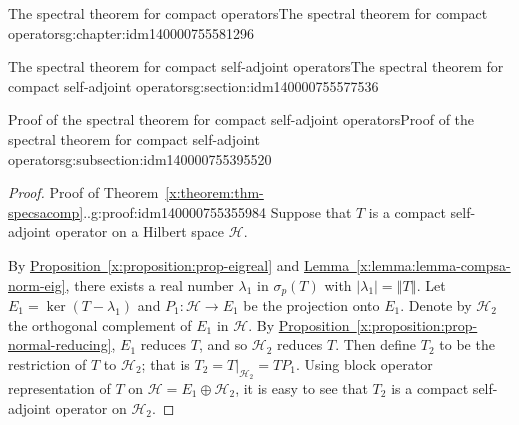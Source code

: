 \documentclass[oneside,10pt,]{book}
\newcommand{\xreffont}{\relax}
\numberwithin{equation}{section}
\newcommand{\hilbert}{\mathcal{H}}
\newcommand{\abs}[1]{\left\vert#1\right\vert}
\newcommand{\norm}[1]{\left\Vert#1\right\Vert}
\newcommand\la{\lambda}
\numberwithin{equation}{section}
\begin{document}
\begin{chapterptx}{The spectral theorem for compact operators}{}{The spectral theorem for compact operators}{}{}{g:chapter:idm140000755581296}
\begin{sectionptx}{The spectral theorem for compact self-adjoint operators}{}{The spectral theorem for compact self-adjoint operators}{}{}{g:section:idm140000755577536}
\begin{subsectionptx}{Proof of the spectral theorem for compact self-adjoint operators}{}{Proof of the spectral theorem for compact self-adjoint operators}{}{}{g:subsection:idm140000755395520}
\begin{proof}{Proof of Theorem~{\xreffont\ref*{x:theorem:thm-specsacomp}}..}{g:proof:idm140000755355984}
Suppose that \(T\) is a compact self-adjoint operator on a Hilbert space \(\hilbert\).%
\par
By \hyperref[x:proposition:prop-eigreal]{Proposition~{\xreffont\ref{x:proposition:prop-eigreal}}} and \hyperref[x:lemma:lemma-compsa-norm-eig]{Lemma~{\xreffont\ref{x:lemma:lemma-compsa-norm-eig}}}, there exists a real number \(\la_1\) in \(\sigma_p(T)\) with \(\abs{\la_1} = \norm{T}\). Let \(E_1 = \ker(T - \la_1)\) and \(P_1:\hilbert \to E_1\) be the projection onto \(E_1\). Denote by \(\hilbert_2\) the orthogonal complement of \(E_1\) in \(\hilbert\). By \hyperref[x:proposition:prop-normal-reducing]{Proposition~{\xreffont\ref{x:proposition:prop-normal-reducing}}}, \(E_1\) reduces \(T\), and so \(\hilbert_2\) reduces \(T\). Then define \(T_2\) to be the restriction of \(T\) to \(\hilbert_2\); that is \(T_2 = T\vert_{\hilbert_2} = T P_1\). Using block operator representation of \(T\) on \(\hilbert = E_1 \oplus \hilbert_2\), it is easy to see that \(T_2\) is a compact self-adjoint operator on \(\hilbert_2\).%
\end{proof}
\end{subsectionptx}
\end{sectionptx}
\end{chapterptx}
%
%
\typeout{************************************************}
\typeout{************************************************}
%
\end{document}
